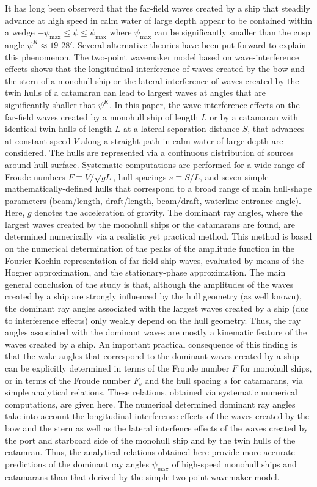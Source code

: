 \begin{englishabstract}
It has long been observerd that the far-field waves created by a ship that steadily
advance at high speed in calm water of large depth appear to be contained within
a wedge $-\psi_{\max}\le\psi\le\psi_{\max}$ where $\psi_{\max}$ can be significantly
smaller than the cusp angle $\psi^K\approx19^\circ28'$. Several alternative
theories have been put forward to explain this phenomenon. The two-point wavemaker
model based on wave-interference effects shows that the longitudinal interference
of waves created by the bow and the stern of a monohull ship or the lateral 
interference of waves created by the twin hulls of a catamaran can lead to largest
waves at angles that are significantly shaller that $\psi^K$. 
In this paper, the wave-interference effects on the far-field waves created by
a monohull ship of length $L$ or by a catamaran with identical twin hulls of
length $L$ at a lateral separation distance $S$, that advances at constant speed
$V$ along a straight path in calm water of large depth are considered. The hulls
are represented via a continuous distribution of sources around hull surface.
Systematic computations are performed for a wide range of Froude numbers 
$F\equiv V/\sqrt{gL}$, hull spacings $s\equiv S/L$, and seven simple 
mathematically-defined hulls that correspond to a broad range of main hull-shape
parameters (beam/length, draft/length, beam/draft, waterline entrance angle). Here,
$g$ denotes the acceleration of gravity. The dominant ray angles, where the largest
waves created by the monohull ships or the catamarans are found, are determined 
numerically via a realistic yet practical method. This method is based on the 
numerical determination of the peaks of the amplitude function in the Fourier-Kochin
representation of far-field ship waves, evaluated by means of the Hogner 
approximation, and the stationary-phase approximation. 
The main general conclusion of the study is that, although the amplitudes of 
the waves created by a ship are strongly influenced by the hull geometry 
(as well known), the dominant ray angles associated with the largest waves created 
by a ship (due to interference effects) only weakly depend on the hull geometry. 
Thus, the ray angles associated with the dominant waves are mostly a kinematic 
feature of the waves created by a ship. An important practical consequence of this 
finding is that the wake angles that correspond to the dominant waves created by a 
ship can be explicitly determined in terms of the Froude number $F$ for monohull 
ships, or in terms of the Froude number $F_s$ and the hull spacing $s$ for 
catamarans, via simple analytical relations. 
These relations, obtained via systematic numerical computations, are given here.
The numerical determined dominant ray angles take into account 
the longitudinal interference effects of the waves created by the bow and the stern
as well as the lateral interfence effects of the waves created by the port and 
starboard side of the monohull ship and by the twin hulls of the catamran. Thus,
the analytical relations obtained here provide more accurate predictions of
the dominant ray angles $\psi_{\max}$ of high-speed monohull ships and catamarans
than that derived by the simple two-point wavemaker model.

\end{englishabstract}

